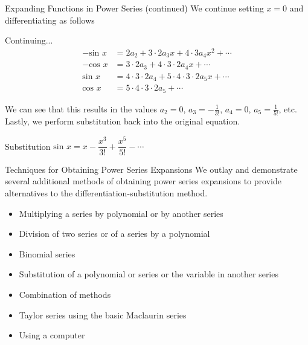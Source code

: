 \documentclass{beamer}
\begin{document}
\begin{frame}{Expanding Functions in Power Series (continued)}
	We continue setting $x=0$ and differentiating as follows
	\begin{exampleblock}{Continuing...}
	\begin{align*}
	-\mbox{sin\ }x &= 2a_2+3\cdot2a_3x+4\cdot3a_4x^2+\cdots \\
	-\mbox{cos\ }x&= 3\cdot2a_3+4\cdot3\cdot2a_4x+\cdots \\
	\mbox{sin\ }x &= 4\cdot3\cdot2a_4+5\cdot4\cdot3\cdot2a_5x+\cdots \\
	\mbox{cos\ }x &= 5\cdot4\cdot3\cdot2a_5+\cdots
	\end{align*}
	\end{exampleblock}
	We can see that this results in the values $a_2=0$, $a_3=-\frac{1}{3!}$, $a_4=0$, $a_5=\frac{1}{5!}$, etc.  Lastly, we perform substitution back into the original equation.
	\begin{exampleblock}{Substitution}
	$\mbox{sin\ } x = x-\dfrac{x^3}{3!}+\dfrac{x^5}{5!}-\cdots$
	\end{exampleblock}
\end{frame}
  
\begin{frame}{Techniques for Obtaining Power Series Expansions}
    We outlay and demonstrate several additional methods of obtaining power series expansions to provide alternatives to the differentiation-substitution method.
    \begin{itemize}
    	\item Multiplying a series by polynomial or by another series
	\item Division of two series or of a series by a polynomial
	\item Binomial series
	\item Substitution of a polynomial or series or the variable in another series
	\item Combination of methods
	\item Taylor series using the basic Maclaurin series
	\item Using a computer
    \end{itemize}
\end{frame}
\end{document}
